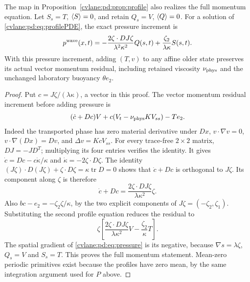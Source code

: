 \begin{cvlanepdproposition}\label{cvlane:pd:prop:pressure}
The map in Proposition~\ref{cvlane:pd:prop:profile} also realizes the full momentum
equation. Let $S_s=T$, $\langle S\rangle=0$, and retain $Q_s=V$, $\langle Q\rangle=0$.
For a solution of \eqref{cvlane:pd:eq:profilePDE}, the exact pressure increment is
\begin{equation}\label{cvlane:pd:eq:pressure}
 p^{\rm wave}(x,t)=
 -\frac{2\zeta\cdot D J\zeta}{\lambda^2\kappa^2}Q(s,t)
 +\frac{\zeta_2}{\lambda\kappa}S(s,t).
\end{equation}
With this pressure increment, adding $(T,v)$ to any affine older state
preserves its actual vector momentum residual, including retained
viscosity $\nu_{\rm phys}$ and the unchanged laboratory buoyancy $\theta e_2$.
\end{cvlanepdproposition}
\begin{proof}
Put $c=J\zeta/(\lambda\kappa)$, a vector in this proof. The vector
momentum residual increment before adding pressure is
\[
 (\dot c+Dc)V+c(V_t-\nu_{\rm phys} K V_{ss})-Te_2.
\]
Indeed the transported phase has zero material derivative under $Dx$,
$v\cdot\nabla v=0$, $v\cdot\nabla(Dx)=Dv$, and
$\Delta v=KcV_{ss}$.
For every trace-free $2\times2$ matrix,
$DJ=-JD^T$; multiplying its four entries verifies the identity.
It gives $\dot c=Dc-c\dot\kappa/\kappa$ and
$\dot\kappa=-2\zeta\cdot D\zeta$.
The identity
$(J\zeta)\cdot D(J\zeta)+\zeta\cdot D\zeta
=\kappa\operatorname{tr}D=0$ shows that $\dot c+Dc$ is orthogonal to
$J\zeta$. Its component along $\zeta$ is therefore
\[
 \dot c+Dc=\frac{2\zeta\cdot D J\zeta}{\lambda\kappa^2}\zeta.
\]
Also $bc-e_2=-\zeta_2\zeta/\kappa$, by the two explicit components of
$J\zeta=(-\zeta_2,\zeta_1)$. Substituting the second profile equation
reduces the residual to
\[
 \zeta\left[
 \frac{2\zeta\cdot D J\zeta}{\lambda\kappa^2}V
 -\frac{\zeta_2}{\kappa}T\right].
\]
The spatial gradient of \eqref{cvlane:pd:eq:pressure} is its negative, because
$\nabla s=\lambda\zeta$, $Q_s=V$ and $S_s=T$.
This proves the full momentum statement. Mean-zero periodic primitives
exist because the profiles have zero mean, by the same integration
argument used for $P$ above.
\end{proof}

